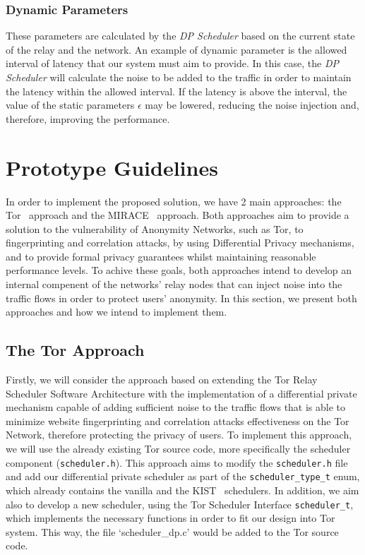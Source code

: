 \subsubsection{Dynamic Parameters}
These parameters are calculated by the \textit{DP Scheduler} based on the current state of the relay and the network. An example of dynamic parameter is the allowed interval of latency that our system must aim to provide. In this case, the \textit{DP Scheduler} will calculate the noise to be added to the traffic in order to maintain the latency within the allowed interval. If the latency is above the interval, the value of the static parameters \(\epsilon\) may be lowered, reducing the noise injection and, therefore, improving the performance.


\section{Prototype Guidelines}\label{sec:prototype_guidelines}

In order to implement the proposed solution, we have 2 main approaches: the Tor~\cite{dingledine2004tor} approach and the MIRACE~\cite{MIRACE} approach. Both approaches aim to provide a solution to the vulnerability of Anonymity Networks, such as Tor, to fingerprinting and correlation attacks, by using Differential Privacy mechanisms, and to provide formal privacy guarantees whilst maintaining reasonable performance levels. To achive these goals, both approaches intend to develop an internal compenent of the networks' relay nodes that can inject noise into the traffic flows in order to protect users' anonymity. In this section, we present both approaches and how we intend to implement them.

\subsection{The Tor Approach}\label{subsec:tor_approach}

Firstly, we will consider the approach based on extending the Tor Relay Scheduler Software Architecture with the implementation of a differential private mechanism capable of adding sufficient noise to the traffic flows that is able to minimize website fingerprinting and correlation attacks effectiveness on the Tor Network, therefore protecting the privacy of users. 
To implement this approach, we will use the already existing Tor source code, more specifically the scheduler component (\texttt{scheduler.h}). This approach aims to modify the \texttt{scheduler.h} file and add our differential private scheduler as part of the \texttt{scheduler\_type\_t} enum, which already contains the vanilla and the KIST~\cite{KIST} schedulers. In addition, we aim also to develop a new scheduler, using the Tor Scheduler Interface \texttt{scheduler\_t}, which implements the necessary functions in order to fit our design into Tor system. This way, the file `scheduler\_dp.c' would be added to the Tor source code.

